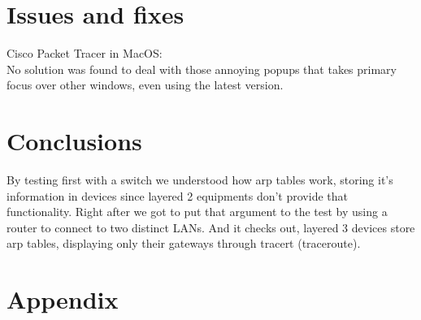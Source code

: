 \documentclass[11pt,a4paper]{report}
\begin{document}
\chapter{Issues and fixes}
    Cisco Packet Tracer in MacOS:\\
        \hspace*{10mm}No solution was found to deal with those annoying popups that takes primary focus over other windows, even using the latest version.

\chapter{Conclusions}
    By testing first with a switch we understood how arp tables work, storing it's information in devices since layered 2 equipments don't provide that functionality. Right after we got to put that argument to the test by using a router to connect to two distinct LANs. And it checks out, layered 3 devices store arp tables, displaying only their gateways through tracert (traceroute).

%
%

\appendix
\chapter{Appendix}
\end{document}
